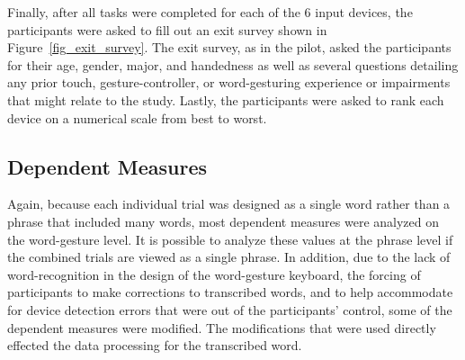 Finally, after all tasks were completed for each of the 6 input devices, the participants were asked to fill out an exit survey shown in Figure~\ref{fig_exit_survey}. The exit survey, as in the pilot, asked the participants for their age, gender, major, and handedness as well as several questions detailing any prior touch, gesture-controller, or word-gesturing experience or impairments that might relate to the study. Lastly, the participants were asked to rank each device on a numerical scale from best to worst.

\begin{table}[h] %
	\centering
	\caption[Final Study Schedule of Assessments]{\centering Schedule of Assessments for a single study visit (in minutes).}
	\label{final_schedule_of_assessments}
\end{table}

\subsection{Dependent Measures} \label{final_dependent_measures}
Again, because each individual trial was designed as a single word rather than a phrase that included many words, most dependent measures were analyzed on the word-gesture level. It is possible to analyze these values at the phrase level if the combined trials are viewed as a single phrase. In addition, due to the lack of word-recognition in the design of the word-gesture keyboard, the forcing of participants to make corrections to transcribed words, and to help accommodate for device detection errors that were out of the participants' control, some of the dependent measures were modified. The modifications that were used directly effected the data processing for the transcribed word.


